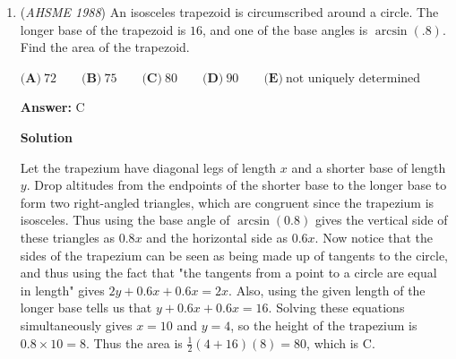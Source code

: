 \begin{enumerate}
 $\textbf{(A)}\ 7\qquad \textbf{(B)}\ 13\qquad \textbf{(C)}\ 18\qquad \textbf{(D)}\ 27\qquad \textbf{(E)}\ 36$

 \textbf{Answer: }B



\textbf{Solution}

By the triangle inequality in $\triangle ABC$, we find that $BC$ and $CA$ must sum to greater than $41$, so they must be (in some order) $7$ and $36$, $13$ and $36$, $18$ and $27$, $18$ and $36$, or $27$ and $36$. We try $7$ and $36$, and now by the triangle inequality in $\triangle ABD$, we must use the remaining numbers $13$, $18$, and $27$ to get a sum greater than $41$, so the only possibility is $18$ and $27$. This works as we can put $BC = 36$, $AC = 7$, $AD = 18$, $BD = 27$, $CD = 13$, so that $\triangle ADC$ and $\triangle BDC$ also satisfy the triangle inequality. Hence we have found a solution that works, and it can be verified that the other possibilities don't work, though as this is a multiple-choice competition, you probably wouldn't do that in order to save time. In any case, the answer is $CD = 13$, which is $\boxed{\text{B}}$.

 


 


	\item (\textit{AHSME 1988}) An isosceles trapezoid is circumscribed around a circle. The longer base of the trapezoid is $16$, 
and one of the base angles is $\arcsin(.8)$. Find the area of the trapezoid.


 $\textbf{(A)}\ 72\qquad \textbf{(B)}\ 75\qquad \textbf{(C)}\ 80\qquad \textbf{(D)}\ 90\qquad \textbf{(E)}\ \text{not uniquely determined}$

 \textbf{Answer: }C



\textbf{Solution}

Let the trapezium have diagonal legs of length $x$ and a shorter base of length $y$. Drop altitudes from the endpoints of the shorter base to the longer base to form two right-angled triangles, which are congruent since the trapezium is isosceles. Thus using the base angle of $\arcsin(0.8)$ gives the vertical side of these triangles as $0.8x$ and the horizontal side as $0.6x$. Now notice that the sides of the trapezium can be seen as being made up of tangents to the circle, and thus using the fact that "the tangents from a point to a circle are equal in length" gives $2y + 0.6x + 0.6x = 2x$. Also, using the given length of the longer base tells us that $y + 0.6x + 0.6x = 16$. Solving these equations simultaneously gives $x=10$ and $y=4$, so the height of the trapezium is $0.8 \times 10 = 8$. Thus the area is $\frac{1}{2}(4+16)(8) = 80$, which is $\boxed{\text{C}}$.


\end{enumerate}

